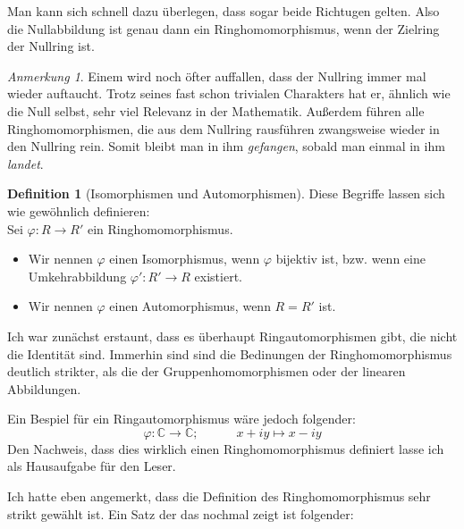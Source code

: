 \documentclass{article}
\theoremstyle{definition}
\newtheorem*{definition}{Definition}
\theoremstyle{remark}
\newtheorem*{anm}{Anmerkung}
\begin{document}
\vspace{0.7em}
Man kann sich schnell dazu überlegen, dass sogar beide
Richtugen gelten. Also die Nullabbildung ist genau dann ein Ringhomomorphismus, wenn der Zielring der Nullring
ist.

\begin{anm}
Einem wird noch öfter auffallen, dass der Nullring immer mal wieder auftaucht. Trotz seines fast schon
trivialen Charakters hat er, ähnlich wie die Null selbst, sehr viel Relevanz in der Mathematik. Außerdem führen
alle Ringhomomorphismen, die aus dem Nullring rausführen zwangsweise wieder in den Nullring rein. Somit bleibt
man in ihm \emph{gefangen}, sobald man einmal in ihm \emph{landet}.
\end{anm}

\begin{definition}[Isomorphismen und Automorphismen] Diese Begriffe lassen sich wie gewöhnlich definieren: \\
Sei $\varphi: R\to R'$ ein Ringhomomorphismus.
\begin{itemize}
    \item Wir nennen $\varphi$ einen Isomorphismus, wenn $\varphi$ bijektiv ist, bzw. wenn eine Umkehrabbildung     $\varphi': R'\to R$ existiert. 
    \item Wir nennen $\varphi$ einen Automorphismus, wenn $R=R'$ ist.
\end{itemize}

\end{definition}

Ich war zunächst erstaunt, dass es überhaupt Ringautomorphismen gibt, die nicht die Identität sind. Immerhin
sind sind die Bedinungen der Ringhomomorphismus deutlich strikter, als die der Gruppenhomomorphismen oder der 
linearen Abbildungen.

Ein Bespiel für ein Ringautomorphismus wäre jedoch folgender:
\[\varphi: \mathbb C\to\mathbb C; \hspace{3em} x+iy \longmapsto x-iy\]
Den Nachweis, dass dies wirklich einen Ringhomomorphismus definiert lasse ich als Hausaufgabe für den Leser.

\newpage
Ich hatte eben angemerkt, dass die Definition des Ringhomomorphismus sehr strikt gewählt ist. Ein Satz der das
nochmal zeigt ist folgender:
\end{document}
